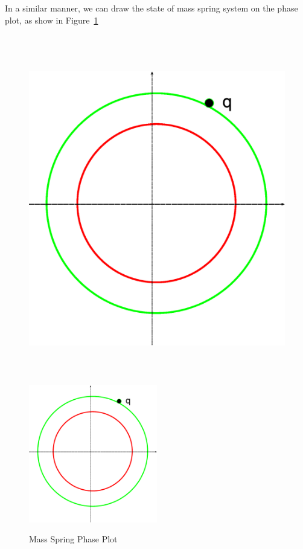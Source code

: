 In a similar manner, we can draw the state of mass spring system on the phase plot, as show in Figure~\ref{fig:massSpringPhasePlot}


\begin{figure}[!htbp]
  \begin{center}
    \leavevmode
    \ifpdf
      \includegraphics[height=6in]{MassSpringPhasePlot}
    \else
      \includegraphics[width=0.5\textwidth]{MassSpringPhasePlot}
    \fi
    \caption{Mass Spring Phase Plot}
    \label{fig:massSpringPhasePlot}
  \end{center}
\end{figure}

